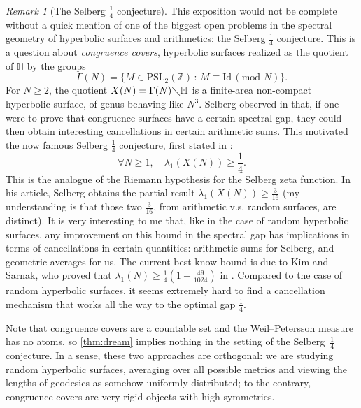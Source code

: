 \documentclass[12pt,twoside]{article}
\theoremstyle{theorem}
\theoremstyle{remark}
\newtheorem{rem}[thm]{Remark}
\theoremstyle{definition}
\theoremstyle{example}
\newcommand{\Z}{\mathbb{Z}}
\newcommand{\IH}{\mathbb{H}}
\newcommand{\1}[1]{\mathds{1}_{#1}}
\begin{document}
\begin{rem}[The Selberg $\frac 14$ conjecture]
  This exposition would not be complete without a quick mention of one of the biggest open problems
  in the spectral geometry of hyperbolic surfaces and arithmetics: the Selberg $\frac 14$
  conjecture. This is a question about \emph{congruence covers}, hyperbolic surfaces realized as
  the quotient of $\IH$ by the groups
  \begin{equation}
    \label{eq:cong}
    \Gamma(N) = \{ M \in \mathrm{PSL}_2(\Z) \, : \, M \equiv \mathrm{Id} \, (\text{mod } N)\}.
  \end{equation}
 For $N \geq 2$, the quotient $X(N) = \Gamma(N) \diagdown \IH$ is a finite-area
  non-compact hyperbolic surface, of genus behaving like $N^3$. Selberg observed in
  \cite{selberg1965} that, if one were to prove that congruence surfaces have a certain spectral
  gap, they could then obtain interesting cancellations in certain arithmetic sums. This motivated
  the now famous Selberg $\frac 14$ conjecture, first stated in \cite{selberg1965}:
  \begin{equation}
    \label{eq:selb_14}
    \forall N \geq 1, \quad \lambda_1(X(N)) \geq \frac 14.
  \end{equation}
  This is the analogue of the Riemann hypothesis for the Selberg zeta function. In his article,
  Selberg obtains the partial result $\lambda_1(X(N)) \geq \frac{3}{16}$ (my understanding is that
  those two $\frac{3}{16}$, from arithmetic v.s. random surfaces, are distinct). It is very
  interesting to me that, like in the case of random hyperbolic surfaces, any improvement on this
  bound in the spectral gap has implications in terms of cancellations in certain quantities:
  arithmetic sums for Selberg, and geometric averages for us. The current best know bound is due to
  Kim and Sarnak, who proved that $\lambda_1(N) \geq \frac 14 \left(1-\frac{49}{1024}\right)$ in
  \cite{kim2003}. Compared to the case of random hyperbolic surfaces, it seems extremely hard to
  find a cancellation mechanism that works all the way to the optimal gap $\frac 14$.

  Note that congruence covers are a countable set and the Weil--Petersson measure has no atoms, so
  \cref{thm:dream} implies nothing in the setting of the Selberg~$\frac 14$ conjecture. In a sense,
  these two approaches are orthogonal: we are studying random hyperbolic surfaces, averaging over all
  possible metrics and viewing the lengths of geodesics as somehow uniformly distributed; to the
  contrary, congruence covers are very rigid objects with high symmetries.
\end{rem}
\end{document}
